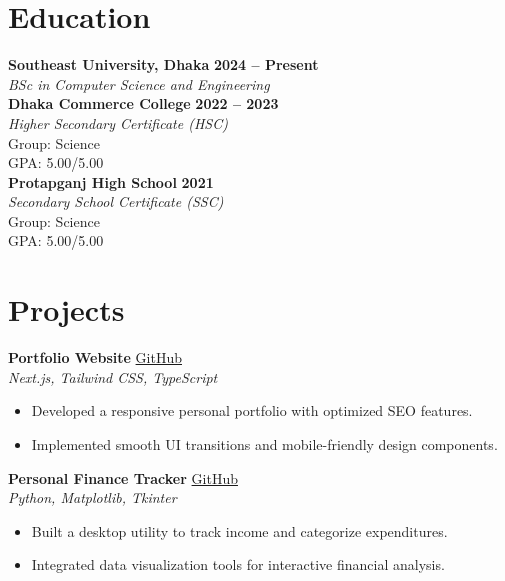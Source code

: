 \documentclass[a4paper,10pt]{article}
\begin{document}
\section*{Education}

\noindent
\textbf{Southeast University, Dhaka} \hfill \textbf{2024 -- Present} \\
\textit{BSc in Computer Science and Engineering} \\

\noindent
\textbf{Dhaka Commerce College} \hfill \textbf{2022 -- 2023} \\
\textit{Higher Secondary Certificate (HSC)} \\
Group: Science \\
GPA: 5.00/5.00 \\

\noindent
\textbf{Protapganj High School} \hfill \textbf{2021} \\
\textit{Secondary School Certificate (SSC)} \\
Group: Science \\
GPA: 5.00/5.00

\section*{Projects}

\noindent \textbf{Portfolio Website} \hfill \href{https://github.com/Mahi-Hamid-Ratul/Portfolio}{GitHub} \\
\textit{Next.js, Tailwind CSS, TypeScript}
\begin{itemize}[noitemsep, topsep=0pt]
    \item Developed a responsive personal portfolio with optimized SEO features.
    \item Implemented smooth UI transitions and mobile-friendly design components.
\end{itemize}

\vspace{6pt}

\noindent \textbf{Personal Finance Tracker} \hfill \href{https://github.com/Mahi-Hamid-Ratul/Personal-Finance-Tracker}{GitHub} \\
\textit{Python, Matplotlib, Tkinter}
\begin{itemize}[noitemsep, topsep=0pt]
    \item Built a desktop utility to track income and categorize expenditures.
    \item Integrated data visualization tools for interactive financial analysis.
\end{itemize}
\end{document}
